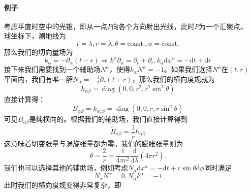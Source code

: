\documentclass[hyperref, UTF8, a4paper]{ctexart}
\begin{document}
\paragraph{例子}

考虑平直时空中的光锥，即从一点$P$向各个方向射出光线，此时$P$为一个汇聚点。球坐标下，测地线为
\begin{equation*}
	t=\lambda ,r=\lambda ,\theta =\mathrm{const.} ,\phi =\mathrm{const.}
\end{equation*}
那么我们的切向量场为
\begin{equation*}
	k_{\alpha } =-\partial _{\alpha }( t-r) \Rightarrow k^{\alpha } \partial _{\alpha } =\partial _{t} +\partial _{r} ,k_{\alpha }\mathrm{d} x^{\alpha } =-\mathrm{d} t+\mathrm{d} r
\end{equation*}
接下来我们需要找到一个辅助场$N^{\alpha }$，使得$k_{\alpha } N^{\alpha } =-1$。如果我们选择$N^{\alpha }$在$( t,r)$平面内，我们有唯一解$N_{\alpha } =-\frac{1}{2} \partial _{r}( t+r)$，那么我们的横向度规就为
\begin{equation*}
	h_{\alpha \beta } =\operatorname{diag} (0,0,r^{2} ,r^{2}\sin^{2} \theta )
\end{equation*}
直接计算得：
\begin{equation*}
	B_{\alpha \beta } =k_{\alpha ;\beta } =\operatorname{diag} (0,0,r,r\sin^{2} \theta )
\end{equation*}
可见$B_{\alpha \beta }$是纯横向的。根据我们的辅助场，我们直接计算得到
\begin{equation*}
	\tilde{B}_{\alpha \beta } =\frac{1}{r} h_{\alpha \beta }
\end{equation*}
这意味着切变张量与涡旋张量都为零。我们的膨胀张量则为
\begin{equation*}
	\theta =\frac{2}{r} =\frac{1}{4\pi r^{2}}\frac{\mathrm{d}}{\mathrm{d} \lambda } (4\pi r^{2} ).
\end{equation*}
我们也可以选择其他的辅助场，例如考虑$N_{\alpha }\mathrm{d} x^{\alpha } =-\mathrm{d} t+r\sin \theta \mathrm{d} \phi $同时满足
\begin{equation*}
	N_{\alpha } N^{\alpha } =0,N_{\alpha } k^{\alpha } =-1
\end{equation*}
此时我们的横向度规变得非常复杂，即
\end{document}
